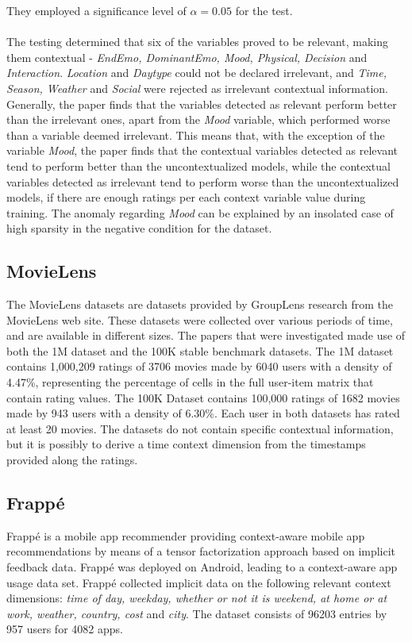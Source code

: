 They employed a significance level of $\alpha = 0.05$ for the test.
\\\\
The testing determined that six of the variables proved to be relevant, making them contextual - \textit{EndEmo, DominantEmo, Mood, Physical, Decision} and \textit{Interaction}.
\textit{Location} and \textit{Daytype} could not be declared irrelevant, and \textit{Time, Season, Weather} and \textit{Social} were rejected as irrelevant contextual information.
Generally, the paper finds that the variables detected as relevant perform better than the irrelevant ones, apart from the \textit{Mood} variable, which performed worse than a variable deemed irrelevant.
This means that, with the exception of the variable \textit{Mood}, the paper finds that the contextual variables detected as relevant tend to perform better than the uncontextualized models, while the contextual variables detected as irrelevant tend to perform worse than the uncontextualized models, if there are enough ratings per each context variable value during training.
The anomaly regarding \textit{Mood} can be explained by an insolated case of high sparsity in the negative condition for the dataset.

\subsection{MovieLens}
The MovieLens datasets are datasets provided by GroupLens research from the MovieLens web site.
These datasets were collected over various periods of time, and are available in different sizes\cite{movielens}.
The papers that were investigated made use of both the 1M dataset and the 100K stable benchmark datasets.
The 1M dataset contains 1,000,209 ratings of 3706 movies made by 6040 users with a density of 4.47\%, representing the percentage of cells in the full user-item matrix that contain rating values\cite{MovieLens2015}.
The 100K Dataset contains 100,000 ratings of 1682 movies made by 943 users with a density of 6.30\%\cite{MovieLens2015}.
Each user in both datasets has rated at least 20 movies.
The datasets do not contain specific contextual information, but it is possibly to derive a time context dimension from the timestamps provided along the ratings.

\subsection{Frappé}
Frappé is a mobile app recommender providing context-aware mobile app recommendations by means of a tensor factorization approach based on implicit feedback data\cite{baltrunas2015frappe}.
Frappé was deployed on Android, leading to a context-aware app usage data set.
Frappé collected implicit data on the following relevant context dimensions: \textit{time of day, weekday, whether or not it is weekend, at home or at work, weather, country, cost} and \textit{city}. 
The dataset consists of 96203 entries by 957 users for 4082 apps.

